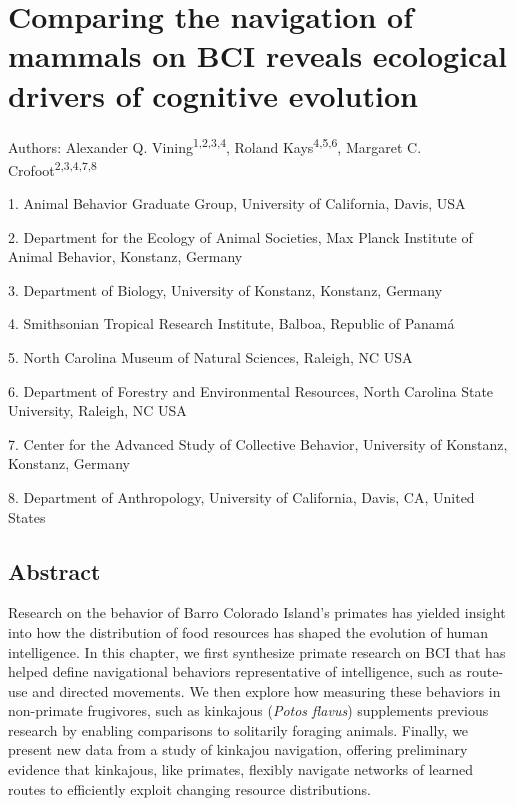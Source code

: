 \documentclass[twoside,12pt,final]{ucthesis-CA2012}
\begin{document}
\begin{ucmainmatter}
\hypertarget{comparing-the-navigation-of-mammals-on-bci-reveals-ecological-drivers-of-cognitive-evolution}{%
\chapter{Comparing the navigation of mammals on BCI reveals ecological drivers of cognitive evolution}\label{comparing-the-navigation-of-mammals-on-bci-reveals-ecological-drivers-of-cognitive-evolution}}


Authors: Alexander Q. Vining\textsuperscript{1,2,3,4}, Roland Kays\textsuperscript{4,5,6}, Margaret C. Crofoot\textsuperscript{2,3,4,7,8}

\par
\begin{scriptsize}
1.  Animal Behavior Graduate Group, University of California, Davis, USA

2.  Department for the Ecology of Animal Societies, Max Planck Institute of Animal Behavior, Konstanz, Germany

3.  Department of Biology, University of Konstanz, Konstanz, Germany

4.  Smithsonian Tropical Research Institute, Balboa, Republic of Panamá

5.  North Carolina Museum of Natural Sciences, Raleigh, NC USA

6.  Department of Forestry and Environmental Resources, North Carolina State University, Raleigh, NC USA

7.  Center for the Advanced Study of Collective Behavior, University of Konstanz, Konstanz, Germany

8.  Department of Anthropology, University of California, Davis, CA, United States
\par
\end{scriptsize}
\hypertarget{abstract-2}{%
\section{Abstract}\label{abstract-2}}

Research on the behavior of Barro Colorado Island's primates has yielded insight into how the distribution of food resources has shaped the evolution of human intelligence. In this chapter, we first synthesize primate research on BCI that has helped define navigational behaviors representative of intelligence, such as route-use and directed movements. We then explore how measuring these behaviors in non-primate frugivores, such as kinkajous (\emph{Potos flavus}) supplements previous research by enabling comparisons to solitarily foraging animals. Finally, we present new data from a study of kinkajou navigation, offering preliminary evidence that kinkajous, like primates, flexibly navigate networks of learned routes to efficiently exploit changing resource distributions.


\end{ucmainmatter}
\end{document}
